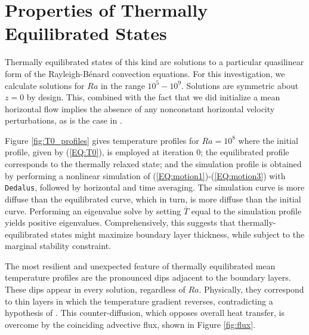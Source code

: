 \documentclass[reprint,amsmath,amssymb,aps]{revtex4-1}
\begin{document}
\section{Properties of Thermally Equilibrated States}\label{sec:properties}
Thermally equilibrated states of this kind are solutions to a particular quasilinear form of the Rayleigh-B\'enard convection equations. For this investigation, we calculate solutions for $Ra$ in the range $10^5 - 10^9$. Solutions are symmetric about $z = 0$ by design. This, combined with the fact that we did initialize a mean horizontal flow implies the absence of any nonconstant horizontal velocity perturbations, as is the case in \cite{Waleffe}. 
\par Figure \ref{fig:T0_profiles} gives temperature profiles for $Ra = 10^8$ where the initial profile, given by (\ref{EQ:T0}), is employed at iteration 0; the equilibrated profile corresponds to the thermally relaxed state; and the simulation profile is obtained by performing a nonlinear simulation of (\ref{EQ:motion1})-(\ref{EQ:motion3}) with \texttt{Dedalus}, followed by horizontal and time averaging. The simulation curve is more diffuse than the equilibrated curve, which in turn, is more diffuse than the initial curve. Performing an eigenvalue solve by setting $\bar{T}$ equal to the simulation profile yields positive eigenvalues. Comprehensively, this suggests that thermally-equilibrated states might maximize boundary layer thickness, while subject to the marginal stability constraint.
\par The most resilient and unexpected feature of thermally equilibrated mean temperature profiles are the pronounced dips adjacent to the boundary layers. These dips appear in every solution, regardless of $Ra$. Physically, they correspond to thin layers in which the temperature gradient reverses, contradicting a hypothesis of \cite{Malkus}. This counter-diffusion, which opposes overall heat transfer, is overcome by the coinciding advective flux, shown in Figure \ref{fig:flux}. 
\end{document}

